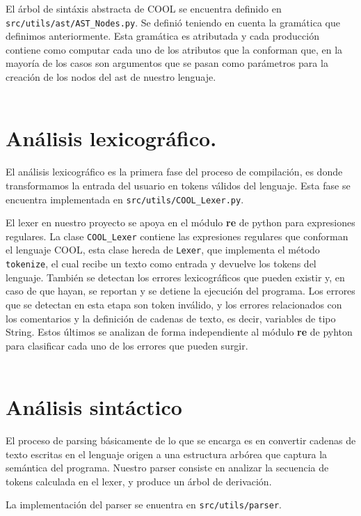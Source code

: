 \documentclass[twoside]{article}
\begin{document}
El \'arbol de sint\'axis abstracta de COOL se encuentra definido en \texttt{src/utils/ast/AST\_Nodes.py}. Se defini\'o teniendo en cuenta la gram\'atica que definimos anteriormente. Esta gram\'atica es atributada y cada producci\'on contiene como computar cada uno de los atributos que la conforman que, en la mayor\'ia de los casos son argumentos que se pasan como par\'ametros para la creaci\'on de los nodos del ast de nuestro lenguaje.\\\\


\section{An\'alisis lexicogr\'afico.}
El an\'alisis lexicogr\'afico es la primera fase del proceso de compilaci\'on, es donde transformamos la entrada del usuario en tokens v\'alidos del lenguaje. Esta fase se encuentra implementada en \texttt{src/utils/COOL\_Lexer.py}. 

El lexer en nuestro proyecto se apoya en el m\'odulo \textbf{re} de python para expresiones regulares. La clase \texttt{COOL\_Lexer} contiene las expresiones regulares que conforman el lenguaje COOL, esta clase hereda de \texttt{Lexer}, que implementa el m\'etodo \texttt{tokenize}, el cual recibe un texto como entrada y devuelve los tokens del lenguaje. Tambi\'en se detectan los errores lexicogr\'aficos que pueden existir y, en caso de que hayan, se reportan y se detiene la ejecuci\'on del programa. Los errores que se detectan en esta etapa son token inv\'alido, y los errores relacionados con los comentarios y la definici\'on de cadenas de texto, es decir, variables de tipo String. Estos \'ultimos se analizan de forma independiente al m\'odulo \textbf{re} de pyhton para clasificar cada uno de los errores que pueden surgir.\\\\


\section{An\'alisis sint\'actico}
El proceso de parsing b\'asicamente de lo que se encarga es en convertir cadenas de texto escritas en el lenguaje origen a una estructura arb\'orea que captura la sem\'antica del programa. Nuestro parser consiste en analizar la secuencia de tokens calculada en el lexer, y produce un \'arbol de derivaci\'on. 

La implementaci\'on del parser se enuentra en \texttt{src/utils/parser}. 
\end{document}
